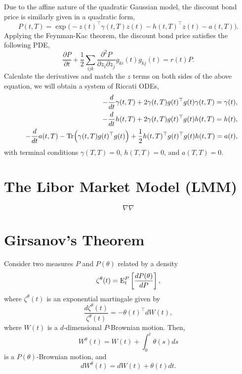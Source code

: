 \documentclass[12pt]{article}
\begin{document}
  Due to the affine nature of the quadratic Gaussian model, the discount bond price is similarly given
  in a quadratic form,
  \begin{equation}
    P(t,T)=\exp\Big(-z(t)^{\top}\gamma(t,T)z(t)-h(t,T)^{\top}z(t)-a(t,T)\Big).
  \end{equation}
  Applying the Feynman-Kac theorem, the discount bond price satisfies the following PDE,
  \begin{equation}
    \frac{\partial P}{\partial t}+\frac{1}{2}\sum_{ijk}
    \frac{\partial^2P}{\partial z_i\partial z_j}g_{ki}(t)g_{kj}(t)=r(t)P.
  \end{equation}
  Calculate the derivatives and match the $z$ terms on both sides of the above equation, we will
  obtain a system of Riccati ODEs,
  \begin{eqnarray}
    && -\frac{d}{dt}\gamma(t,T) + 2\gamma(t,T)g(t)^{\top}g(t)\gamma(t,T)=\gamma(t),\\
    && -\frac{d}{dt}h(t,T) + 2\gamma(t,T)g(t)^{\top}g(t)h(t,T)=h(t),\\
    && -\frac{d}{dt}a(t,T) - {\rm Tr}\Big(\gamma(t,T)g(t)^{\top}g(t)\Big) + \frac{1}{2}h(t,T)^{\top}g(t)^{\top}g(t)h(t,T)=a(t),
  \end{eqnarray}
  with terminal conditions $\gamma(T,T)=0$, $h(T,T)=0$, and $a(T,T)=0$.



\section{The Libor Market Model (LMM)}

  $$\nabla\nabla$$

\appendix

  \section{Girsanov's Theorem}
  \label{Girsanov}

    Consider two measures $P$ and $P(\theta)$ related by a density
    \begin{equation}
      \zeta^{\theta}(t) = {\rm E}_t^P\left[\frac{dP(\theta)}{dP}\right],
    \end{equation}
    where $\zeta^{\theta}(t)$ is an exponential martingale given by
    \begin{equation}
      \frac{d\zeta^{\theta}(t)}{\zeta^{\theta}(t)}=-\theta(t)^{\top}dW(t),
    \end{equation}
    where $W(t)$ is a $d$-dimensional $P$-Brownian motion. Then,
    \begin{equation}
      W^{\theta}(t) = W(t)+\int_0^t\theta(s)ds
    \end{equation}
    is a $P(\theta)$-Brownian motion, and
    \begin{equation}
      dW^{\theta}(t) = dW(t)+ \theta(t)dt.
    \end{equation}
\end{document}
